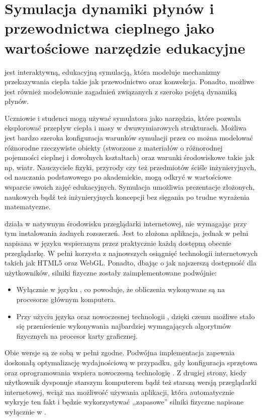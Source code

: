 \chapter{Symulacja dynamiki płynów i przewodnictwa cieplnego jako wartościowe narzędzie edukacyjne}

\en jest interaktywną, edukacyjną symulacją, która modeluje mechanizmy
przekazywania ciepła takie jak przewodnictwo oraz konwekcja. Ponadto, możliwe
jest również modelowanie zagadnień związanych z szeroko pojętą dynamiką płynów.

Uczniowie i studenci mogą używać symulatora \en jako narzędzia, które pozwala
eksplorować przepływ ciepła i masy w dwuwymiarowych strukturach. Możliwa jest
bardzo szeroka konfiguracja warunków symulacji przez co można modelować
różnorodne rzeczywiste obiekty (stworzone z materiałów o różnorodnej pojemności
cieplnej i dowolnych kształtach) oraz warunki środowiskowe takie jak np. wiatr.
Nauczyciele fizyki, przyrody czy też przedmiotów ściśle inżynieryjnych, od
nauczania podstawowego po akademickie, mogą odkryć w \en wartościowe wsparcie
swoich zajęć edukacyjnych. Symulacja umożliwia prezentacje złożonych, naukowych
bądź też inżynieryjnych koncepcji bez sięgania po trudne wyrażenia matematyczne.

\en działa w natywnym środowisku przeglądarki internetowej, nie wymagając przy
tym instalowania żadnych rozszerzeń. Jest to złożona aplikacja, jednak w pełni
napisana w języku \js wspieranym przez praktycznie każdą dostępną obecnie
przeglądarkę. W pełni korzysta z najnowszych osiągnięć technologii internetowych
takich jak HTML5 oraz WebGL. Ponadto, dbając o jak najszerszą dostępność dla
użytkowników, silniki fizyczne zostały zaimplementowane podwójnie:

\begin{itemize} 

\item Wyłącznie w języku \js, co powoduje, że obliczenia wykonywane są na
procesorze głównym komputera.

\item Przy użyciu języka \js oraz nowoczesnej technologii , dzięki
czemu możliwe stało się przeniesienie wykonywania najbardziej wymagających
algorytmów fizycznych na procesor karty graficznej.

\end{itemize}

Obie wersje są ze sobą w pełni zgodne. Podwójna implementacja zapewnia doskonałą
optymalizację wydajnościową w przypadku, gdy konfiguracja sprzętowa oraz
oprogramowania wspiera nowoczesną technologię . Z drugiej strony,
kiedy użytkownik dysponuje starszym komputerem bądź też starszą wersją
przeglądarki internetowej, wciąż ma możliwość używania aplikacji, która
automatycznie wykryje ten fakt i będzie wykorzystywać ,,zapasowe'' silniki
fizyczne napisane wyłącznie w \js.

